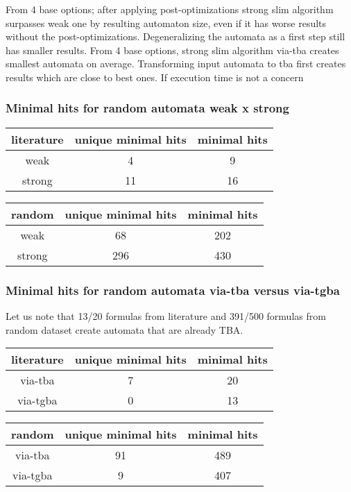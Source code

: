 \documentclass[
	digital
nolof, nolot
]{fithesis3}
\begin{document}
	From 4 base options; after applying post-optimizations strong slim algorithm surpasses weak one by resulting automaton size, even if it has worse results without the post-optimizations.
	Degeneralizing the automata as a first step still has smaller results.
	From 4 base options, strong slim algorithm via-tba creates smallest automata on average.
	Transforming input automata to tba first creates results which are close to best ones. If execution time is not a concern
	
		\subsubsection{Minimal hits for random automata weak x strong}
		\begin{center}
			\begin{tabular}{ |c|c|c| } 
				\hline
				literature&unique minimal hits&minimal hits\\
				\hline
				weak&4 & 9\\
				\hline
				strong&11 & 16\\ 
				\hline
			\end{tabular}
		\end{center}
	\begin{center}
		\begin{tabular}{ |c|c|c| } 
			\hline
			random&unique minimal hits&minimal hits\\
			\hline
			weak&68 & 202\\
			\hline
			strong&296 & 430\\ 
			\hline
		\end{tabular}
	\end{center}
		\subsubsection{Minimal hits for random automata via-tba versus via-tgba}
		Let us note that 13/20 formulas from literature and 391/500 formulas from random dataset create automata that are already TBA. 
		\begin{center}
			\begin{tabular}{ |c|c|c| } 
				\hline
				literature&unique minimal hits&minimal hits\\
				\hline
				via-tba&7 & 20\\
				\hline
				via-tgba&0 & 13\\ 
				\hline
			\end{tabular}
		\end{center}
				\begin{center}
			\begin{tabular}{ |c|c|c| } 
				\hline
				random&unique minimal hits&minimal hits\\
				\hline
				via-tba&91 & 489\\
				\hline
				via-tgba&9 & 407\\ 
				\hline
			\end{tabular}
		\end{center}
	
\end{document}
